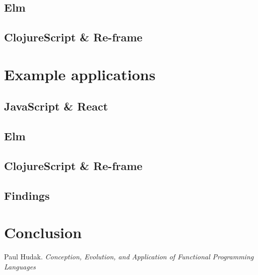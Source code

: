 \documentclass[12pt, titlepage]{article}
\begin{document}
\subsection{Elm}
\subsection{ClojureScript \& Re-frame}

\section{Example applications}
\subsection{JavaScript \& React}

\subsection{Elm}

\subsection{ClojureScript \& Re-frame}

\subsection{Findings}

\section{Conclusion}

\renewcommand{\refname}{References}

\begin{thebibliography}{9}

Paul Hudak.
\textit{Conception, Evolution, and Application of Functional Programming Languages}

\end{thebibliography}
\end{document}
